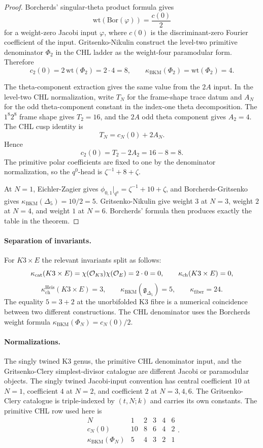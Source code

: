 \begin{proof}
Borcherds' singular-theta product formula gives
\[
  \mathrm{wt}(\mathrm{Bor}(\varphi))=\frac{c(0)}{2}
\]
for a weight-zero Jacobi input \(\varphi\), where \(c(0)\) is the
discriminant-zero Fourier coefficient of the input.  Gritsenko-Nikulin
construct the level-two primitive denominator \(\Phi_2\) in the CHL
ladder as the weight-four paramodular form.  Therefore
\[
  c_2(0)=2\,\mathrm{wt}(\Phi_2)=2\cdot 4=8,
  \qquad
  \kappa_{\mathrm{BKM}}(\Phi_2)=\mathrm{wt}(\Phi_2)=4.
\]

The theta-component extraction gives the same value from the \(2A\)
input.  In the level-two CHL normalization, write \(T_N\) for the
frame-shape trace datum and \(A_N\) for the odd theta-component
constant in the index-one theta decomposition.  The \(1^8 2^8\)
frame shape gives \(T_2=16\), and the \(2A\) odd theta component gives
\(A_2=4\).  The CHL cusp identity is
\[
  T_N=c_N(0)+2A_N.
\]
Hence
\[
  c_2(0)=T_2-2A_2=16-8=8.
\]
The primitive polar coefficients are fixed to one by the denominator
normalization, so the \(q^0\)-head is
\(\zeta^{-1}+8+\zeta\).

At \(N=1\), Eichler-Zagier gives
\(\phi_{0,1}|_{q^0}=\zeta^{-1}+10+\zeta\), and Borcherds-Gritsenko
gives \(\kappa_{\mathrm{BKM}}(\Delta_5)=10/2=5\).  Gritsenko-Nikulin
give weight \(3\) at \(N=3\), weight \(2\) at \(N=4\), and weight
\(1\) at \(N=6\).  Borcherds' formula then produces exactly the table
in the theorem.
\end{proof}

\paragraph{Separation of invariants.}
For \(K3\times E\) the relevant invariants split as follows:
\[
  \kappa_{\mathrm{cat}}(K3\times E)
  =\chi(\mathcal{O}_{K3})\chi(\mathcal{O}_E)=2\cdot 0=0,
  \qquad
  \kappa_{\mathrm{ch}}(K3\times E)=0,
\]
\[
  \kappa_{\mathrm{ch}}^{\mathrm{Heis}}(K3\times E)=3,
  \qquad
  \kappa_{\mathrm{BKM}}(\mathfrak g_{\Delta_5})=5,
  \qquad
  \kappa_{\mathrm{fiber}}=24.
\]
The equality \(5=3+2\) at the unorbifolded K3 fibre is a numerical
coincidence between two different constructions.  The CHL denominator
uses the Borcherds weight formula
\(\kappa_{\mathrm{BKM}}(\Phi_N)=c_N(0)/2\).

\paragraph{Normalizations.}
The singly twined K3 genus, the primitive CHL denominator input, and
the Gritsenko-Clery simplest-divisor catalogue are different Jacobi or
paramodular objects.  The singly twined Jacobi-input convention has
central coefficient \(10\) at \(N=1\), coefficient \(4\) at \(N=2\),
and coefficient \(2\) at \(N=3,4,6\).  The Gritsenko-Clery catalogue
is triple-indexed by \((t,N;k)\) and carries its own constants.  The
primitive CHL row used here is
\[
  \begin{array}{c|ccccc}
  N & 1 & 2 & 3 & 4 & 6\\
  \hline
  c_N(0) & 10 & 8 & 6 & 4 & 2\\
  \kappa_{\mathrm{BKM}}(\Phi_N) & 5 & 4 & 3 & 2 & 1
  \end{array}.
\]

